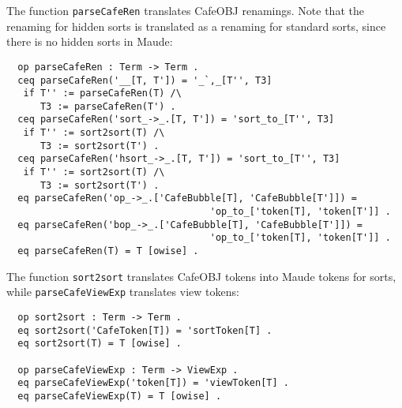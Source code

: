 \begin{comment}

In the same way, the function \verb"parseCafeModExp" transforms the CafeOBJ syntax
for module expressions into Maude syntax. Note that the syntax for tokens is also
translated when required:

{\codesize
\begin{verbatim}
  op parseCafeModExp : Term -> ModuleExpression .
  eq parseCafeModExp('CafeToken[T]) = 'token[T] .
  eq parseCafeModExp('token[T]) = 'token[T] .
  ceq parseCafeModExp('_`(_`)[T, T']) = '_`{_`}[T'', T''']
   if T'' := parseCafeModExp(T) /\
      T''' := parseCafeViewExp(T') .
  ceq parseCafeModExp('_*`{_`}[T, T']) = '_*`(_`)[T'', T''']
   if T'' := parseCafeModExp(T) /\
      T''' := parseCafeRen(T') .
  ceq parseCafeModExp('_+_[T, T']) = '_+_[T'', T''']
   if T'' := parseCafeModExp(T) /\
      T''' := parseCafeModExp(T') .
\end{verbatim}
}

\end{comment}

The function \verb"parseCafeRen" translates CafeOBJ renamings. Note that
the renaming for hidden sorts is translated as a renaming for standard sorts, since
there is no hidden sorts in Maude:

{\codesize
\begin{verbatim}
  op parseCafeRen : Term -> Term .
  ceq parseCafeRen('__[T, T']) = '_`,_[T'', T3]
   if T'' := parseCafeRen(T) /\
      T3 := parseCafeRen(T') .
  ceq parseCafeRen('sort_->_.[T, T']) = 'sort_to_[T'', T3]
   if T'' := sort2sort(T) /\
      T3 := sort2sort(T') .
  ceq parseCafeRen('hsort_->_.[T, T']) = 'sort_to_[T'', T3]
   if T'' := sort2sort(T) /\
      T3 := sort2sort(T') .
  eq parseCafeRen('op_->_.['CafeBubble[T], 'CafeBubble[T']]) =
                                    'op_to_['token[T], 'token[T']] .
  eq parseCafeRen('bop_->_.['CafeBubble[T], 'CafeBubble[T']]) =
                                    'op_to_['token[T], 'token[T']] .
  eq parseCafeRen(T) = T [owise] .
\end{verbatim}
}

The function \verb"sort2sort" translates CafeOBJ tokens into Maude tokens
for sorts, while \verb"parseCafeViewExp" translates view tokens:

{\codesize
\begin{verbatim}
  op sort2sort : Term -> Term .
  eq sort2sort('CafeToken[T]) = 'sortToken[T] .
  eq sort2sort(T) = T [owise] .

  op parseCafeViewExp : Term -> ViewExp .
  eq parseCafeViewExp('token[T]) = 'viewToken[T] .
  eq parseCafeViewExp(T) = T [owise] .
\end{verbatim}
}

